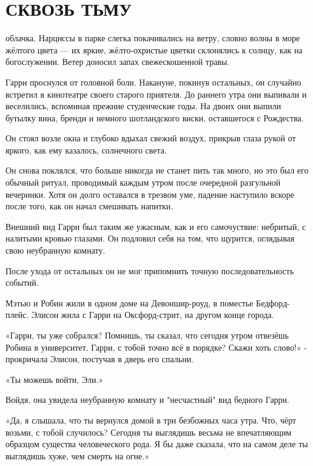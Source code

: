 \documentclass[a4paper,12pt]{book}
\begin{document}
\chapter{СКВОЗЬ ТЬМУ}
\noindent{} облачка. Нарциссы в парке слегка покачивались на ветру, словно волны в море жёлтого цвета — их яркие, жёлто-охристые цветки склонялись к солнцу, как на богослужении. Ветер доносил запах свежескошенной травы.\\
\par
Гарри проснулся от головной боли. Накануне, покинув остальных, он случайно встретил в кинотеатре своего старого приятеля. До раннего утра они выпивали и веселились, вспоминая прежние студенческие годы. На двоих они выпили бутылку вина, бренди и немного шотландского виски, оставшегося с Рождества.
\par
Он стоял возле окна и глубоко вдыхал свежий воздух, прикрыв глаза рукой от яркого, как ему казалось, солнечного света.
\par
Он снова поклялся, что больше никогда не станет пить так много, но это был его обычный ритуал, проводимый каждым утром после очередной разгульной вечеринки. Хотя он долго оставался в трезвом уме, падение наступило вскоре после того, как он начал смешивать напитки.
\par
Внешний вид Гарри был таким же ужасным, как и его самочуствие: небритый, с налитыми кровью глазами. Он подловил себя на том, что щурится, оглядывая свою неубранную комнату.
\par
После ухода от остальных он не мог припомнить точную последовательность событий.
\par
Мэтью и Робин жили в одном доме на Девоншир-роуд, в поместье Бедфорд-плейс. Элисон жила с Гарри на Оксфорд-стрит, на другом конце города.\\
\par
«Гарри, ты уже собрался? Помнишь, ты сказал, что сегодня утром отвезёшь Робина в университет. Гарри, с тобой точно всё в порядке? Скажи хоть слово!» - прокричала Элисон, постучав в дверь его спальни.
\par
«Ты можешь войти, Эли.»
\par
Войдя, она увидела неубранную комнату и "несчастный" вид бедного Гарри.
\par
«Да, я слышала, что ты вернулся домой в три безбожных часа утра. Что, чёрт возьми, с тобой случилось? Сегодня ты выглядишь весьма не впечатляющим образцом существа человеческого рода. Я бы даже сказала, что на самом деле ты выглядишь хуже, чем смерть на огне.»
\end{document}
